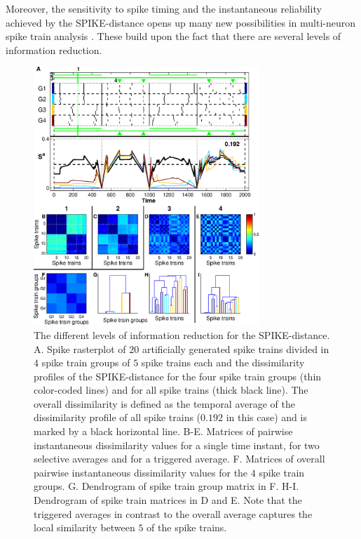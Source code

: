 \documentclass[10pt,twocolumn]{elsart5p}
\begin{document}
Moreover, the sensitivity to spike timing and the instantaneous reliability achieved by the SPIKE-distance opens up many new possibilities in multi-neuron spike train analysis \citep{Kreuz13}. These build upon the fact that there are several levels of information reduction.
%
%
\begin{figure}
    \includegraphics[width=85mm]{Fig2_SPIKE_Representations.eps}
    \caption{\abb\label{fig:Fig2-SPIKE-Representations} The different levels of information reduction for the SPIKE-distance.  A. Spike rasterplot of $20$ artificially generated spike trains divided in $4$ spike train groups of $5$ spike trains each and the dissimilarity profiles of the SPIKE-distance for the four spike train groups (thin color-coded lines) and for all spike trains (thick black line). The overall dissimilarity is defined as the temporal average of the dissimilarity profile of all spike trains ($0.192$ in this case) and is marked by a black horizontal line.  B-E. Matrices of pairwise instantaneous dissimilarity values for a single time instant, for two selective averages and for a triggered average.  F. Matrices of overall pairwise instantaneous dissimilarity values for the $4$ spike train groups.  G. Dendrogram of spike train group matrix in F.  H-I. Dendrogram of spike train matrices in D and E. Note that the triggered averages in contrast to the overall average captures the local similarity between $5$ of the spike trains.}
\end{figure}
%
\end{document}
